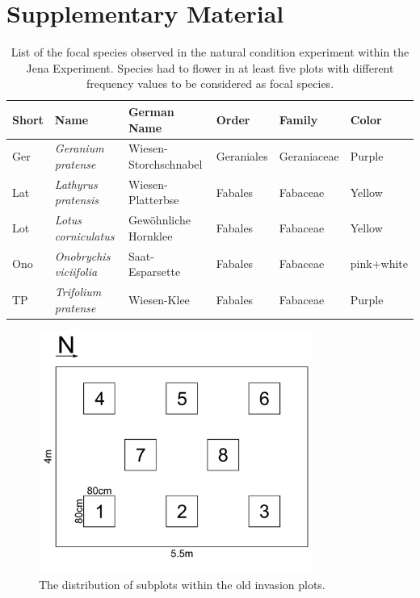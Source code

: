 \label{ch:supplementary_material}

\section*{Supplementary Material}
\beginsupplement

\begin{table}[htbp]
	\centering
	\caption{List of the focal species observed in the natural condition experiment within the Jena Experiment. Species had to flower in at least five plots with different frequency values to be considered as focal species.}
	\begin{tabular}{llllll}
		\toprule
		\textbf{Short} & \textbf{Name} & \textbf{German Name} & \textbf{Order} & \textbf{Family} & \textbf{Color} \\
		\midrule
		Ger   & \textit{Geranium pratense} & Wiesen-Storchschnabel & Geraniales & Geraniaceae & Purple \\
		Lat   & \textit{Lathyrus pratensis} & Wiesen-Platterbse & Fabales & Fabaceae & Yellow \\
		Lot   & \textit{Lotus corniculatus} & Gewöhnliche Hornklee & Fabales & Fabaceae & Yellow \\
		Ono   & \textit{Onobrychis viciifolia} & Saat-Esparsette & Fabales & Fabaceae & pink+white \\
		TP    & \textit{Trifolium pratense} & Wiesen-Klee & Fabales & Fabaceae & Purple \\
		\bottomrule
	\end{tabular}%
	\label{tab:Species}
\end{table}%


\begin{figure} [H] %
\centering
\includegraphics[width=9cm]{Images/plot-design}
 \caption{The distribution of subplots within the old invasion plots.}
 \label{fig:plot-design}
\end{figure}


